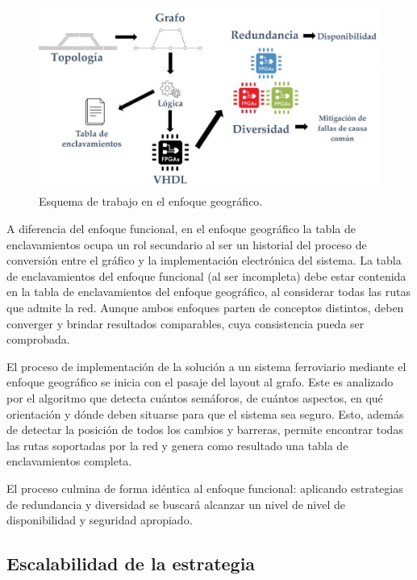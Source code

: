 		\begin{figure}[h]
		\centering
			\includegraphics[scale=.5]{./Figures/Geografico_workflow}
			\caption{Esquema de trabajo en el enfoque geográfico.}
			\label{fig:Work_Geografico}
		\end{figure}
	
		A diferencia del enfoque funcional, en el enfoque geográfico la tabla de enclavamientos ocupa un rol secundario al ser un historial del proceso de conversión entre el gráfico y la implementación electrónica del sistema. La tabla de enclavamientos del enfoque funcional (al ser incompleta) debe estar contenida en la tabla de enclavamientos del enfoque geográfico, al considerar todas las rutas que admite la red. Aunque ambos enfoques parten de conceptos distintos, deben converger y brindar resultados comparables, cuya consistencia pueda ser comprobada.
		
		El proceso de implementación de la solución a un sistema ferroviario mediante el enfoque geográfico se inicia con el pasaje del layout al grafo. Este es analizado por el algoritmo que detecta cuántos semáforos, de cuántos aspectos, en qué orientación y dónde deben situarse para que el sistema sea seguro. Esto, además de detectar la posición de todos los cambios y barreras, permite encontrar todas las rutas soportadas por la red y genera como resultado una tabla de enclavamientos completa.
		
		El proceso culmina de forma idéntica al enfoque funcional: aplicando estrategias de redundancia y diversidad se buscará alcanzar un nivel de nivel de disponibilidad y seguridad apropiado.
		
		\subsection{Escalabilidad de la estrategia}	
			
